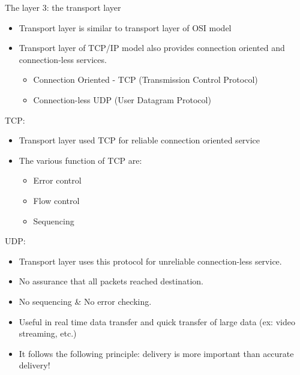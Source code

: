 \documentclass{beamer}[10pt, usepdftitle=false, handout]
\begin{document}
	\begin{frame}
	
	The layer 3: the transport layer
	\vspace*{1em}	
	
	\begin{itemize}
	\item{Transport layer is similar to transport layer of OSI model}
	\item{Transport layer of TCP/IP model also provides connection oriented and connection-less services.
		\begin{itemize}
			\item{Connection Oriented - TCP (Transmission Control Protocol)}
			\item{Connection-less UDP (User Datagram Protocol)}
		\end{itemize}			
	
	}
		
	\end{itemize}	 	
	
	\end{frame}
	
	\begin{frame}

	TCP:
	\vspace*{1em}	
	
	\begin{itemize}
	\item{Transport layer used TCP for reliable connection oriented service}
	\item{The various function of TCP are:
	\begin{itemize}
	\item{Error control}
	\item{Flow control}
	\item{Sequencing}
	\end{itemize}
	
	}
	
	\end{itemize}		
	
	
	\end{frame}
	
	\begin{frame}
	UDP:
	\vspace*{1em}
	
	\begin{itemize}
	\item{Transport layer uses this protocol for unreliable connection-less service.}
	\item{No assurance that all packets reached destination.}
	\item{No sequencing \& No error checking.}
	\item{Useful in real time data transfer and quick transfer of large data (ex: video streaming, etc.)}
	\item{It follows the following principle: delivery is more important than accurate delivery!}
	\end{itemize}
	\end{frame}
	
\end{document}
